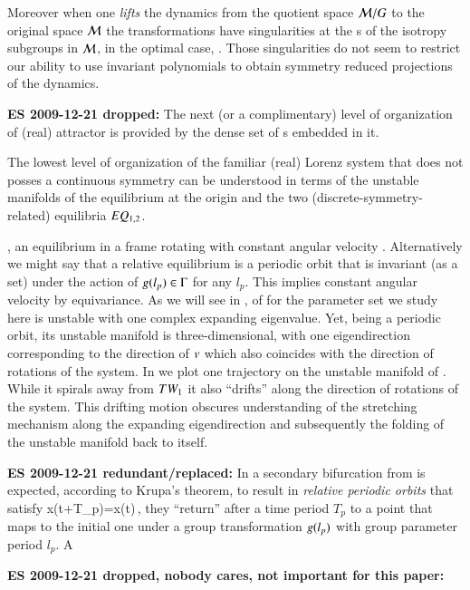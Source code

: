 Moreover when
one \emph{lifts} the dynamics from the quotient space
$\mathcal{M}/G$ to the original space $\mathcal{M}$ the transformations
have singularities at the \fixedsp s of
the isotropy subgroups in $\mathcal{M}$, in the optimal case, \cf
{}. Those singularities do not seem to
restrict our ability to use invariant polynomials to obtain
symmetry reduced projections of the dynamics.

{\bf ES 2009-12-21 dropped:}
The next (or a complimentary) level of organization of (real)
{\Le} attractor is provided by the dense set of \po s
embedded in it. 

The lowest level of organization of the
familiar (real) Lorenz system that does not posses a
continuous symmetry can be
understood in terms of the unstable
manifolds of the equilibrium at the origin and the two
(discrete-symmetry-related) equilibria $EQ_{1,2}$. 


, an equilibrium
in a frame rotating with constant angular velocity .
Alternatively we might say that a relative equilibrium is a
periodic orbit that is invariant (as a set) under the action
of $g(l_p)\in\Gamma$ for any $l_p$.
    This implies constant angular velocity by
    equivariance.
As we will see in ,  of {\cLe}
for the parameter set we study here is unstable with one
complex expanding eigenvalue. Yet, being a periodic orbit,
its unstable manifold is three-dimensional, with one
eigendirection corresponding to the direction of $v$ which
also coincides with the direction of rotations of the system.
In  we plot one trajectory on the unstable
manifold of . While it spirals away from
$TW_{1}$ it also ``drifts'' along the direction of
rotations of the system. This drifting motion obscures
understanding of the stretching mechanism along the expanding
eigendirection and subsequently the folding of the unstable
manifold back to itself.


{\bf ES 2009-12-21 redundant/replaced:}
In {\cLe} a secondary
bifurcation from  is expected, according to Krupa's
theorem, to result in \emph{relative periodic
orbits} that satisfy
\beq
	x(t+T_p)=x(t)\,,
\eeq
{\ie} they ``return'' after a time period $T_p$ to a point
that maps to the initial one under a group transformation
$g(l_p)$ with group parameter period $l_p$. A {\rpo}

{\bf ES 2009-12-21 dropped, nobody cares, not important for this paper:}

